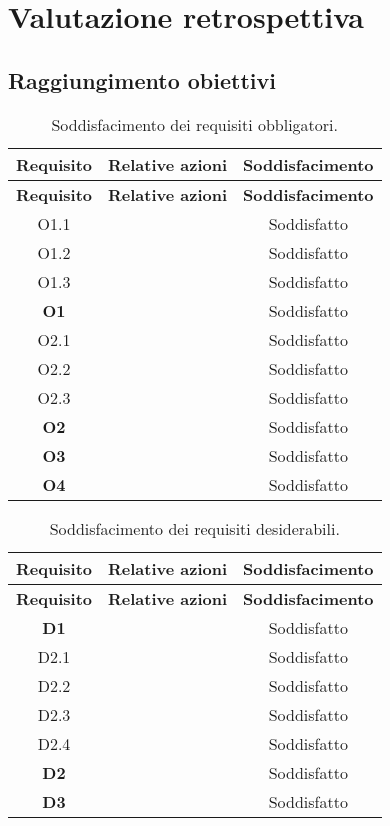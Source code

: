 \chapter{Valutazione retrospettiva}
\label{cap:valutazioneRetrospettiva}

\section{Raggiungimento obiettivi}
\begin{longtable}{|c|p{11cm}|c}
    \caption{Soddisfacimento dei requisiti obbligatori.}
    \label{tab:soddReqObbligatori}\\
    \hline \textbf{Requisito} & \textbf{Relative azioni} & \textbf{Soddisfacimento}\\ \hline \endfirsthead
    \hline \textbf{Requisito} & \textbf{Relative azioni} & \textbf{Soddisfacimento}\\ \hline \endhead
    \hline \endfoot
    \hline \endlastfoot
    \hline O1.1  & & Soddisfatto\\
    \hline O1.2  & & Soddisfatto\\
    \hline O1.3  & & Soddisfatto\\
    \textbf{O1}    & & Soddisfatto\\
    \hline O2.1  & & Soddisfatto\\
    \hline O2.2  & & Soddisfatto\\
    \hline O2.3  & & Soddisfatto\\
    \hline \textbf{O2}  & & Soddisfatto\\
    \hline \textbf{O3}  & & Soddisfatto\\
    \hline \textbf{O4}  & & Soddisfatto\\
\end{longtable}

\begin{longtable}{|c|p{11cm}|c}
    \caption{Soddisfacimento dei requisiti desiderabili.}
    \label{tab:soddReqDesiderabili}\\
    \hline \textbf{Requisito} & \textbf{Relative azioni} & \textbf{Soddisfacimento}\\ \hline \endfirsthead
    \hline \textbf{Requisito} & \textbf{Relative azioni} & \textbf{Soddisfacimento}\\ \hline \endhead
    \hline \endfoot
    \hline \endlastfoot
    \textbf{D1}  & & Soddisfatto\\
    \hline D2.1  & & Soddisfatto\\
    \hline D2.2  & & Soddisfatto\\
    \hline D2.3  & & Soddisfatto\\
    \hline D2.4  & & Soddisfatto\\
    \hline \textbf{D2}  & & Soddisfatto\\
    \hline \textbf{D3}  & & Soddisfatto\\
\end{longtable}

